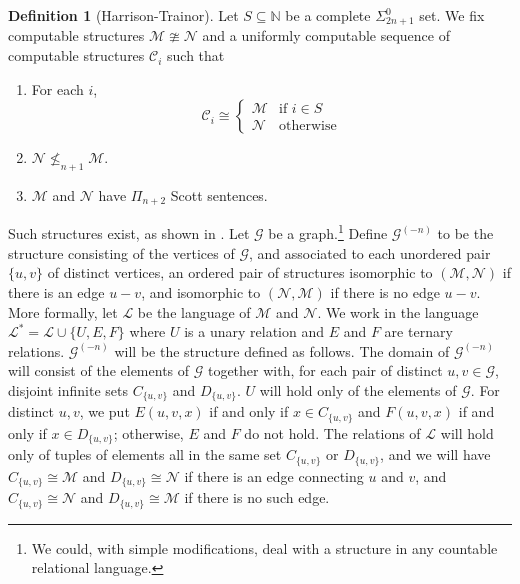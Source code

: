 \documentclass[10pt,a4paper]{article}
\newcommand{\Inv}[2]{{#2}^{(-#1)}}
\theoremstyle{definition}
\newtheorem{defn}[thm]{Definition}
\begin{document}
	\begin{defn}[Harrison-Trainor]
		Let $S \subseteq \mathbb{N}$ be a complete $\Sigma^0_{2n+1}$ set. We fix computable structures $\mathcal{M} \ncong \mathcal{N}$ and a uniformly computable sequence of computable structures $\mathcal{C}_i$ such that
		\begin{enumerate}
			\item For each $i$,
			\[\mathcal{C}_i\cong\left\{\begin{array}{cc} \mathcal{M} & \mbox{if $i\in S$}\\
				\mathcal{N} & \mbox{otherwise}
			\end{array}\right.\]
			\item $\mathcal{N} \nleq_{n+1} \mathcal{M}$.
			\item $\mathcal{M}$ and $\mathcal{N}$ have $\Pi_{n+2}$ Scott sentences.
		\end{enumerate}
		Such structures exist, as shown in \cite{unfriendly}.
		Let $\mathcal{G}$ be a graph.\footnote{We could, with simple modifications, deal with a structure in any countable relational language.} Define $\Inv{n}{\mathcal{G}}$ to be the structure consisting of the vertices of $\mathcal{G}$, and associated to each unordered pair $\{u,v\}$ of distinct vertices, an ordered pair of structures isomorphic to $(\mathcal{M},\mathcal{N})$ if there is an edge $u - v$, and isomorphic to $(\mathcal{N},\mathcal{M})$ if there is no edge $u - v$. More formally, let $\mathcal{L}$ be the language of $\mathcal{M}$ and $\mathcal{N}$. We work in the language $\mathcal{L}^* = \mathcal{L} \cup \{U,E,F\}$ where $U$ is a unary relation and $E$ and $F$ are ternary relations. $\Inv{n}{\mathcal{G}}$ will be the structure defined as follows. The domain of $\Inv{n}{\mathcal{G}}$ will consist of the elements of $\mathcal{G}$ together with, for each pair of distinct $u,v \in \mathcal{G}$, disjoint infinite sets $C_{\{u,v\}}$ and $D_{\{u,v\}}$. $U$ will hold only of the elements of $\mathcal{G}$. For distinct $u,v$, we put $E(u,v,x)$ if and only if $x \in C_{\{u,v\}}$ and $F(u,v,x)$ if and only if $x \in D_{\{u,v\}}$; otherwise, $E$ and $F$ do not hold. The relations of $\mathcal{L}$ will hold only of tuples of elements all in the same set $C_{\{u,v\}}$ or $D_{\{u,v\}}$, and we will have $C_{\{u,v\}} \cong \mathcal{M}$ and $D_{\{u,v\}} \cong \mathcal{N}$ if there is an edge connecting $u$ and $v$, and $C_{\{u,v\}} \cong \mathcal{N}$ and $D_{\{u,v\}} \cong \mathcal{M}$ if there is no such edge.
	\end{defn}
	
\end{document}
